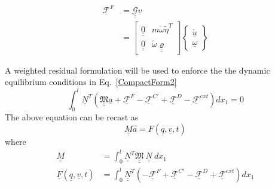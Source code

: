 \documentclass{aiaa-tc}
\newcommand{\tens}[1]{\underline{\underline{#1}}}
\renewcommand{\vec}[1]{\underline{#1}}
\begin{document}
\begin{align}
    \underline{\mathcal{F}}^F &= \underline{\underline{\mathcal{G}}} \underline{v}  \nonumber \\
    \label{CompactForm4}
    &= \begin{bmatrix}
    \underline{\underline{0}} & m \tilde{\omega} \tilde{\eta}^T \\
    \underline{\underline{0}} & \tilde{\omega}  \underline{\underline{\varrho}}
    \end{bmatrix}
    \begin{Bmatrix}
    \dot{\underline{u}} \\
    \underline{\omega}
    \end{Bmatrix} 
\end{align}

A weighted residual formulation will be used to enforce the the dynamic equilibrium conditions in Eq.~\eqref{CompactForm2}
\begin{equation}
    \label{FEM-1}
    \int_0^l \tens{N}^T (\tens{\mathfrak{M}} \vec{a} + \vec{\mathcal{F}}^F - \vec{\mathcal{F}}^{C\prime} + \vec{\mathcal{F}}^D - \vec{\mathcal{F}}^{ext}) d x_1=0
\end{equation}
The above equation can be recast as
\begin{equation}
    \label{FEM-2}
    \tens{M} \hat{a} = F(\vec{q},\vec{v},t)
\end{equation}
where
\begin{align}
    \label{FEM-3}
    \tens{M} &= \int_0^l \tens{N}^T \tens{\mathfrak{M}}~ \tens{N}~dx_1 \\
    \label{FEM-4}
    \vec{F}(\vec{q},\vec{v},t) &= \int_0^l \tens{N}^T (-\vec{\mathcal{F}}^F + \vec{\mathcal{F}}^{C\prime} - \vec{\mathcal{F}}^D + \vec{\mathcal{F}}^{ext}) d x_1
\end{align}
\end{document}
